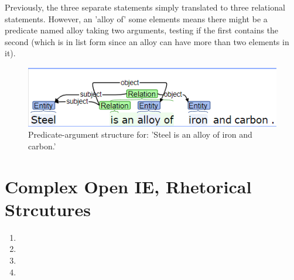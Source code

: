 \documentclass[12pt]{report}
\begin{document}
\begin{enumerate}
    Previously, the three separate statements simply translated to three
    relational statements. However, an 'alloy of' some elements means there
    might be a predicate named alloy taking two arguments, testing if the first
    contains the second (which is in list form since an alloy can have more
    than two elements in it).\par
  \begin{figure}[ht]
    \includegraphics[width=\linewidth]{task4pas.PNG}
    \caption{Predicate-argument structure for: 'Steel is an alloy of iron and
    carbon.'}
    \label{PAStruct}
  \end{figure}
\end{enumerate}

\section{Complex Open IE, Rhetorical Strcutures}
\begin{enumerate}
  \item
  \item
  \item
  \item 
\end{enumerate}
\end{document}
